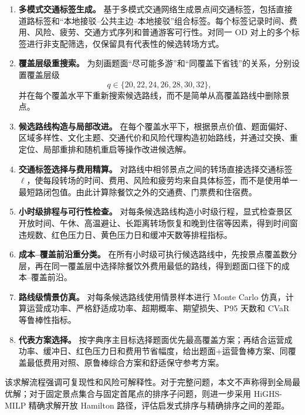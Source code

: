 \documentclass[UTF8,zihao=-4,a4paper]{ctexart}
\begin{document}
\begin{enumerate}
    \item \textbf{多模式交通标签生成。}
    基于多模式交通网络生成景点间交通标签，包括直接道路标签和“本地接驳--公共主边--本地接驳”组合标签。每个标签记录时间、费用、风险、疲劳、交通方式序列和普通游客可行性。对同一 OD 对上的多个标签进行非支配筛选，仅保留具有代表性的候选转场方式。

    \item \textbf{覆盖层级重搜索。}
    为刻画题面“尽可能多游”和“同覆盖下省钱”的关系，分别设置覆盖层级
    \[
    q\in\{20,22,24,26,28,30,32\},
    \]
    并在每个覆盖水平下重新搜索候选路线，而不是简单从高覆盖路线中删除景点。

    \item \textbf{候选路线构造与局部改进。}
    在每个覆盖水平下，根据景点价值、题面偏好、区域多样性、文化主题、交通代价和风险代理构造初始路线，并通过交换、重定位、局部重排和随机重启等操作改进候选解。

    \item \textbf{交通标签选择与费用精算。}
    对路线中相邻景点之间的转场直接选择交通标签 $\ell$，使每段转场的时间、费用、风险和疲劳均来自具体标签，而不是使用单一最短路闭包值。由此计算除餐饮之外的交通费、门票费和住宿费。

    \item \textbf{小时级排程与可行性检查。}
    对每条候选路线构造小时级行程，显式检查景区开放时间、午休、高温避让、长距离转场恢复和晚到住宿等因素，得到时间窗违规数、红色压力日、黄色压力日和缓冲天数等排程指标。

    \item \textbf{成本--覆盖前沿重分类。}
    在所有小时级可执行候选路线中，先按景点覆盖数分层，再在同一覆盖层中选择除餐饮外费用最低的路线，得到题面口径下的成本--覆盖前沿。

    \item \textbf{路线级情景仿真。}
    对每条候选路线使用情景样本进行 Monte Carlo 仿真，计算运营成功率、严格舒适成功率、超期概率、期望损失、P95 天数和 CVaR 等鲁棒性指标。

    \item \textbf{代表方案选择。}
    按字典序主目标选择题面优先最高覆盖方案；再结合运营成功率、缓冲日、红色压力日和费用节省幅度，给出题面+运营鲁棒方案、同覆盖最低费用对照、原鲁棒综合方案和舒适保守参考方案。
\end{enumerate}

该求解流程强调可复现性和风险可解释性。对于完整问题，本文不声称得到全局最优解；对于固定景点集合与固定首尾点的排序子问题，则进一步采用 HiGHS-MILP 精确求解开放 Hamilton 路径，评估启发式排序与精确排序之间的差距。
\end{document}
